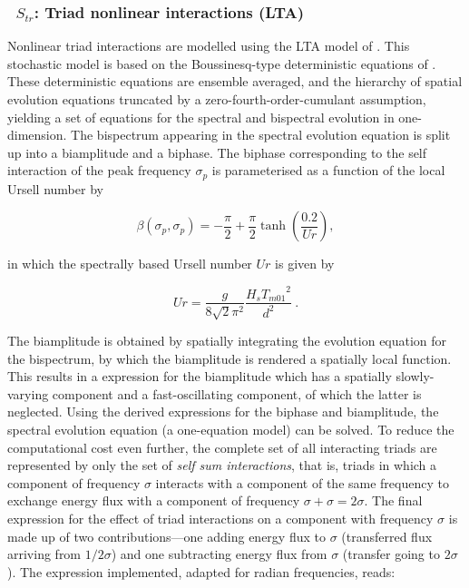 \vsssub
\subsubsection{~$S_{tr}$: Triad nonlinear interactions (LTA)} \label{sec:TR1}
\vsssub


Nonlinear triad interactions are modelled using the LTA model of 
\citep{rep:Eld96}. This stochastic model is based on the 
Boussinesq-type deterministic equations of \citep{art:MS93}. 
These deterministic equations are ensemble averaged, and the hierarchy 
of spatial evolution equations truncated by a zero-fourth-order-cumulant 
assumption, yielding a set of equations for the spectral and bispectral 
evolution in one-dimension. The bispectrum appearing in the spectral 
evolution equation is split up into a biamplitude and a biphase. The 
biphase corresponding to the self interaction of the peak frequency 
$\sigma_p$ is parameterised as a function of the local Ursell number by

\begin{equation}
   \beta(\sigma_p,\sigma_p) = -\frac{\pi}{2} + \frac{\pi}{2}\tanh\left( \frac{0.2}{Ur} \right),
   \label{eq:biphase}
\end{equation}

\noindent
in which the spectrally based Ursell number $Ur$ is given by

\begin{equation}
   Ur = \frac{g}{8\sqrt{2} \pi^2} \frac{H_s {T_{m01}}^2}{d^2}\  .
   \label{eq:ursell}
\end{equation}


The biamplitude is obtained by spatially integrating the evolution equation
for the bispectrum, by which the biamplitude is rendered a spatially local
function. This results in a expression for the biamplitude which has a
spatially slowly-varying component and a fast-oscillating component, of which
the latter is neglected. Using the derived expressions for the biphase and
biamplitude, the spectral evolution equation (a one-equation model) can be
solved. To reduce the computational cost even further, the complete set of all
interacting triads are represented by only the set of \textit{self sum
  interactions}, that is, triads in which a component of frequency $\sigma$
interacts with a component of the same frequency to exchange energy flux with
a component of frequency $\sigma + \sigma = 2\sigma$. The final expression for
the effect of triad interactions on a component with frequency $\sigma$ is
made up of two contributions---one adding energy flux to $\sigma$ (transferred
flux arriving from $1/2 \sigma$) and one subtracting energy flux from $\sigma$
(transfer going to $2 \sigma$). The expression implemented, adapted for radian
frequencies, reads:

